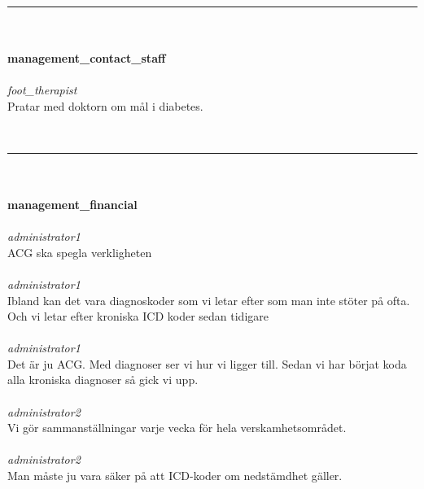 \documentclass[12pt,a4paper,oneside]{article}
\begin{document}
\ \vspace{.66em}\\
\hrule
\ \vspace{.33em}\\
\ \\{\bf management\_contact\_staff }
\\\ \\%
 { \it foot\_therapist %
}\\
Pratar med doktorn om m{\aa}l i diabetes. %


\ \vspace{.66em}\\
\hrule
\ \vspace{.33em}\\
\ \\{\bf management\_financial }
\\\ \\%
 { \it administrator1 %
}\\
ACG ska spegla verkligheten %
\ \\\ \\
 { \it   administrator1 %
}\\
Ibland kan det vara diagnoskoder som vi letar efter som man inte st{\"o}ter p{\aa} ofta. Och vi letar efter kroniska ICD koder sedan tidigare %
\ \\\ \\
 { \it   administrator1 %
}\\
Det {\"a}r ju ACG. Med diagnoser ser vi hur vi ligger till. Sedan vi har b{\"o}rjat  koda alla kroniska diagnoser s{\aa} gick vi upp.  %
\ \\\ \\
 { \it   administrator2 %
}\\
Vi g{\"o}r sammanst{\"a}llningar varje vecka f{\"o}r hela verskamhetsomr{\aa}det. %
\ \\\ \\
 { \it   administrator2 %
}\\
Man m{\aa}ste ju vara s{\"a}ker p{\aa} att ICD-koder om nedst{\"a}mdhet g{\"a}ller.  %
\end{document}
